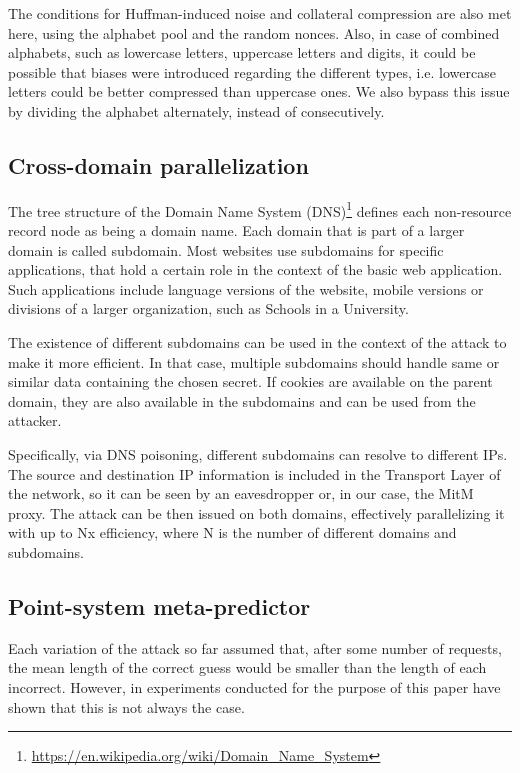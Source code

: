 The conditions for Huffman-induced noise and collateral compression are also met
here, using the alphabet pool and the random nonces. Also, in case of combined
alphabets, such as lowercase letters, uppercase letters and digits, it could be
possible that biases were introduced regarding the different types, i.e.
lowercase letters could be better compressed than uppercase ones. We also bypass
this issue by dividing the alphabet alternately, instead of consecutively.

\subsection{Cross-domain parallelization}

The tree structure of the Domain Name System
(DNS)\footnote{\url{https://en.wikipedia.org/wiki/Domain_Name_System}} defines
each non-resource record node as being a domain name. Each domain that is part
of a larger domain is called subdomain. Most websites use subdomains for
specific applications, that hold a certain role in the context of the basic web
application. Such applications include language versions of the website, mobile
versions or divisions of a larger organization, such as Schools in a University.

The existence of different subdomains can be used in the context of the attack
to make it more efficient. In that case, multiple subdomains should handle same
or similar data containing the chosen secret. If cookies are available on the
parent domain, they are also available in the subdomains and can be used from
the attacker.

Specifically, via DNS poisoning, different subdomains can resolve to different
IPs. The source and destination IP information is included in the Transport
Layer of the network, so it can be seen by an eavesdropper or, in our case, the
MitM proxy. The attack can be then issued on both domains, effectively
parallelizing it with up to Nx efficiency, where N is the number of different
domains and subdomains.

\subsection{Point-system meta-predictor}

Each variation of the attack so far assumed that, after some number of requests,
the mean length of the correct guess would be smaller than the length of each
incorrect. However, in experiments conducted for the purpose of this paper have
shown that this is not always the case.

